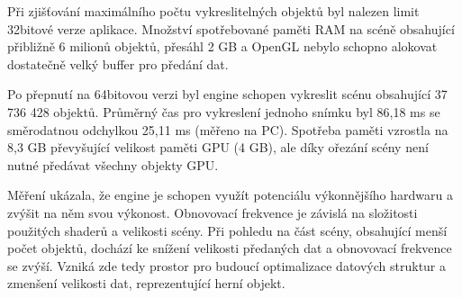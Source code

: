 \documentclass[thesis=M,czech]{FITthesis}[2019/12/23]
\begin{document}
Při zjišťování maximálního počtu vykreslitelných objektů byl nalezen limit 32bitové verze aplikace. Množství spotřebované paměti RAM na scéně obsahující přibližně 6 milionů objektů, přesáhl 2 GB a OpenGL nebylo schopno alokovat dostatečně velký buffer pro předání dat.

Po přepnutí na 64bitovou verzi byl engine schopen vykreslit scénu obsahující 37 736 428 objektů. Průměrný čas pro vykreslení jednoho snímku byl 86,18 ms se směrodatnou odchylkou 25,11 ms (měřeno na PC). Spotřeba paměti vzrostla na 8,3 GB převyšující velikost paměti GPU (4 GB), ale díky ořezání scény není nutné předávat všechny objekty GPU.

Měření ukázala, že engine je schopen využít potenciálu výkonnějšího hardwaru a zvýšit na něm svou výkonost. Obnovovací frekvence je závislá na složitosti použitých shaderů a velikosti scény. Při pohledu na část scény, obsahující menší počet objektů, dochází ke snížení velikosti předaných dat a obnovovací frekvence se zvýší. Vzniká zde tedy prostor pro budoucí optimalizace datových struktur a zmenšení velikosti dat, reprezentující herní objekt.



\end{document}
